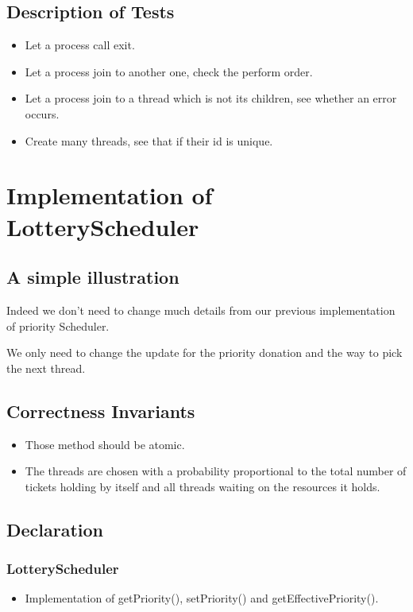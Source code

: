 \documentclass{article}
\begin{document}
	\subsection{Description of Tests}
	\begin{itemize}
		\item Let a process call exit.
		\item Let a process join to another one, check the perform order.
		\item Let a process join to a thread which is not its children, see whether an error occurs.
		\item Create many threads, see that if their id is unique.
	\end{itemize}
	\section{Implementation of LotteryScheduler}
	\subsection{A simple illustration}
	Indeed we don't need to change much details from our previous implementation of priority Scheduler.
	
	We only need to change the update for the priority donation and the way to pick the next thread.
	\subsection{Correctness Invariants}
	\begin{itemize}
		\item Those method should be atomic.
		\item The threads are chosen with a probability proportional to the total number of tickets holding by itself and all threads waiting on the resources it holds.
	\end{itemize}
	
	\subsection{Declaration}
	\subsubsection{LotteryScheduler}
	
	\begin{itemize}
		\item Implementation of getPriority(), setPriority() and getEffectivePriority().
	\end{itemize}
	
\end{document}
